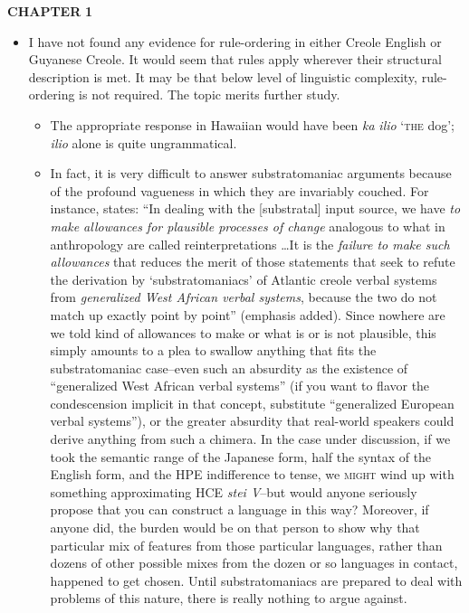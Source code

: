 
\textbf{CHAPTER} \textbf{1}

\begin{itemize}
\item I have not found any evidence for rule-ordering in either Creole English or Guyanese Creole. It would seem that rules apply wherever their structural description is met. It may be that below level of linguistic complexity, rule-ordering is not required. The topic merits further study.

\begin{itemize}
\item The appropriate response in Hawaiian would have been \textit{ka} \textit{ilio} `\textsc{the} dog'; \textit{ilio} alone is quite ungrammatical.
\end{itemize}



\begin{itemize}
\item In fact, it is very difficult to answer substratomaniac argu\-ments because of the profound vagueness in which they are invariably couched. For instance, \citet{Alleyne1979} states: ``In dealing with the [substratal] input source, we have \textit{to make allowances for plausible processes of change} analogous to what in anthropology are called reinterpretations \ldots  It is the \textit{failure to make such allowances} that reduces the merit of those statements that seek to refute the derivation by `substratomaniacs' of Atlantic creole verbal systems from \textit{generalized West African verbal systems}, because the two do not match up exactly point by point'' (emphasis added). Since nowhere are we told kind of allowances to make or what is or is not plausible, this simply amounts to a plea to swallow anything that fits the substratomaniac case--even such an absurdity as the existence of ``generalized West African verbal systems'' (if you want to flavor the condescension implicit in that concept, substitute ``generalized European verbal systems''), or the greater absurdity that real-world speakers could derive anything from such a chimera. In the case under discussion, if we took the semantic range of the Japanese form, half the syntax of the English form, and the HPE indifference to tense, we \textsc{might} wind up with something approximating HCE \textit{stei V}--but would anyone seriously propose that you can construct a language in this way? Moreover, if anyone did, the burden would be on that person to show why that particular mix of features from those particular languages, rather than dozens of other possible mixes from the dozen or so lan\-guages in contact, happened to get chosen. Until substratomaniacs are prepared to deal with problems of this nature, there is really nothing to argue against.


\end{itemize}
\end{itemize}
